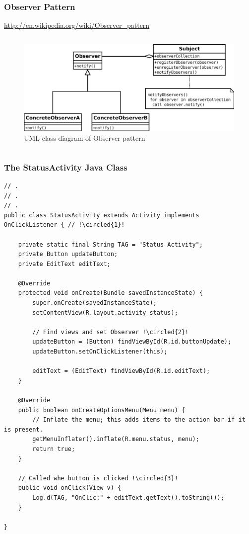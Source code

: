 \begin{frame}[fragile]
\frametitle{Observer Pattern}
\url{http://en.wikipedia.org/wiki/Observer_pattern}\\
\begin{columns}
	\begin{figure}
	\includegraphics[width= 1.0 \textwidth]{observer.eps}
	\caption{UML class diagram of Observer pattern}
	\end{figure}
\end{columns}
\end{frame}
\begin{frame}
\frametitle{The StatusActivity Java Class}
\lstset{language=java, style=eclipse, breaklines=true, tabsize=2}
\centering
\begin{lstlisting}[caption=src/com/artemisa/yamba/StatusActivity.java, basicstyle=\tiny, escapechar=! ]
// .
// .
// .
public class StatusActivity extends Activity implements OnClickListener { // !\circled{1}!

	private static final String TAG = "Status Activity";
	private Button updateButton;
	private EditText editText;

	@Override
	protected void onCreate(Bundle savedInstanceState) {
		super.onCreate(savedInstanceState);
		setContentView(R.layout.activity_status);

		// Find views and set Observer !\circled{2}!
		updateButton = (Button) findViewById(R.id.buttonUpdate);
		updateButton.setOnClickListener(this);

		editText = (EditText) findViewById(R.id.editText);
	}

	@Override
	public boolean onCreateOptionsMenu(Menu menu) {
		// Inflate the menu; this adds items to the action bar if it is present.
		getMenuInflater().inflate(R.menu.status, menu);
		return true;
	}

	// Called whe button is clicked !\circled{3}!
	public void onClick(View v) {
		Log.d(TAG, "OnClic:" + editText.getText().toString());
	}

}

\end{lstlisting}
\end{frame}
